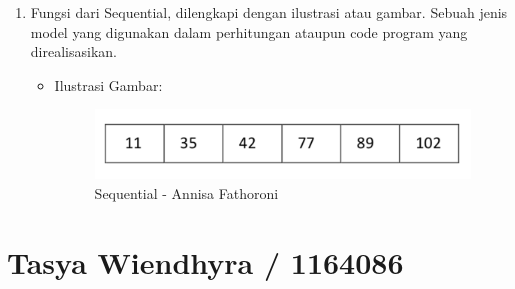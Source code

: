 \begin{enumerate}
\begin{enumerate}
\begin{itemize}
\end{itemize}
\end{enumerate}

\item Fungsi dari Sequential, dilengkapi dengan ilustrasi atau gambar.
Sebuah jenis model yang digunakan dalam perhitungan ataupun code program yang direalisasikan.
\begin{itemize}
\item Ilustrasi Gambar:

\begin{figure}[!hbtp]
\centering
\includegraphics[scale=0.7]{figures/Chapter6AnnisaFathoroni8.png}
\caption{Sequential - Annisa Fathoroni}
\label{Sequential - Annisa Fathoroni}
\end{figure}

\end{itemize}
\end{enumerate}

\section{Tasya Wiendhyra / 1164086}
